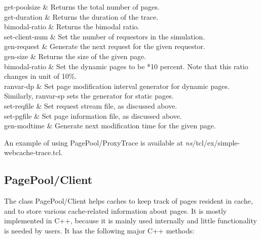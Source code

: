 \begin{\par\tabular{\textwidth}{rX}}
get-poolsize & Returns the total number of pages. \\

get-duration & Returns the duration of the trace. \\

bimodal-ratio & Returns the bimodal ratio. \\

set-client-num  & Set the number of requestors in the
simulation. \\

gen-request  & Generate the next request for the given
requestor. \\

gen-size  & Returns the size of the given page. \\

bimodal-ratio  & Set the dynamic pages to be *10
percent. Note that this ratio changes in unit of 10\%. \\

ranvar-dp  & Set page modification interval generator for 
dynamic pages. Similarly, ranvar-sp  sets the generator
for static pages. \\

set-reqfile  & Set request stream file, as discussed
above. \\

set-pgfile  & Set page information file, as discussed
above. \\

gen-modtime   & Generate next
modification time for the given page. \\
\end{\par\tabular{\textwidth}{rX}}

An example of using PagePool/ProxyTrace is available at 
\emph{ns}/tcl/ex/simple-webcache-trace.tcl. 


\subsection{PagePool/Client}

The class PagePool/Client helps caches to keep track of pages resident
in cache, and to store various cache-related information about
pages. It is mostly implemented in C++, because it is mainly used
internally and little functionality is needed by users. It has the
following major C++ methods:


